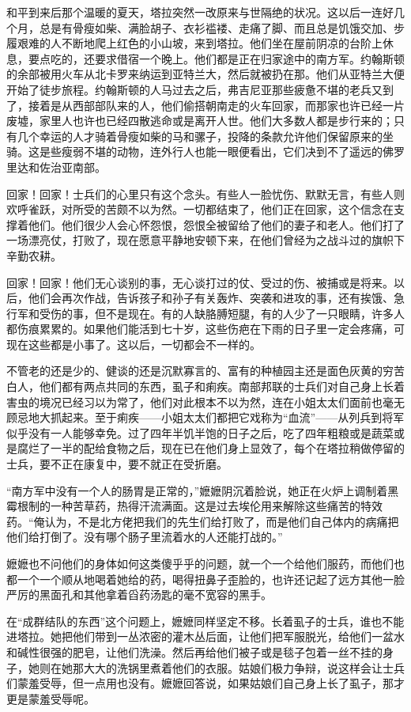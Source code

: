 \par 和平到来后那个温暖的夏天，塔拉突然一改原来与世隔绝的状况。这以后一连好几个月，总是有骨瘦如柴、满脸胡子、衣衫褴褛、走痛了脚、而且总是饥饿交加、步履艰难的人不断地爬上红色的小山坡，来到塔拉。他们坐在屋前阴凉的台阶上休息，要点吃的，还要求借宿一个晚上。他们都是正在归家途中的南方军。约翰斯顿的余部被用火车从北卡罗来纳运到亚特兰大，然后就被扔在那。他们从亚特兰大便开始了徒步旅程。约翰斯顿的人马过去之后，弗吉尼亚那些疲惫不堪的老兵又到了，接着是从西部部队来的人，他们偷搭朝南走的火车回家，而那家也许已经一片废墟，家里人也许也已经四散逃命或是离开人世。他们大多数人都是步行来的；只有几个幸运的人才骑着骨瘦如柴的马和骡子，投降的条款允许他们保留原来的坐骑。这是些瘦弱不堪的动物，连外行人也能一眼便看出，它们决到不了遥远的佛罗里达和佐治亚南部。
\par 回家！回家！士兵们的心里只有这个念头。有些人一脸忧伤、默默无言，有些人则欢呼雀跃，对所受的苦颇不以为然。一切都结束了，他们正在回家，这个信念在支撑着他们。他们很少人会心怀怨恨，怨恨全被留给了他们的妻子和老人。他们打了一场漂亮仗，打败了，现在愿意平静地安顿下来，在他们曾经为之战斗过的旗帜下辛勤农耕。
\par 回家！回家！他们无心谈别的事，无心谈打过的仗、受过的伤、被捕或是将来。以后，他们会再次作战，告诉孩子和孙子有关轰炸、突袭和进攻的事，还有挨饿、急行军和受伤的事，但不是现在。有的人缺胳膊短腿，有的人少了一只眼睛，许多人都伤痕累累的。如果他们能活到七十岁，这些伤疤在下雨的日子里一定会疼痛，可现在这些都是小事了。这以后，一切都会不一样的。
\par 不管老的还是少的、健谈的还是沉默寡言的、富有的种植园主还是面色灰黄的穷苦白人，他们都有两点共同的东西，虱子和痢疾。南部邦联的士兵们对自己身上长着害虫的境况已经习以为常了，他们对此根本不以为然，连在小姐太太们面前也毫无顾忌地大抓起来。至于痢疾——小姐太太们都把它戏称为“血流”——从列兵到将军似乎没有一人能够幸免。过了四年半饥半饱的日子之后，吃了四年粗粮或是蔬菜或是腐烂了一半的配给食物之后，现在已在他们身上显效了，每个在塔拉稍做停留的士兵，要不正在康复中，要不就正在受折磨。
\par “南方军中没有一个人的肠胃是正常的，”嬷嬷阴沉着脸说，她正在火炉上调制着黑霉根制的一种苦草药，热得汗流满面。这是过去埃伦用来解除这些痛苦的特效药。“俺认为，不是北方佬把我们的先生们给打败了，而是他们自己体内的病痛把他们给打倒了。没有哪个肠子里流着水的人还能打战的。”
\par 嬷嬷也不问他们的身体如何这类傻乎乎的问题，就一个一个给他们服药，而他们也都一个一个顺从地喝着她给的药，喝得扭鼻子歪脸的，也许还记起了远方其他一脸严厉的黑面孔和其他拿着舀药汤匙的毫不宽容的黑手。
\par 在“成群结队的东西”这个问题上，嬷嬷同样坚定不移。长着虱子的士兵，谁也不能进塔拉。她把他们带到一丛浓密的灌木丛后面，让他们把军服脱光，给他们一盆水和碱性很强的肥皂，让他们洗澡。然后再给他们被子或是毯子包着一丝不挂的身子，她则在她那大大的洗锅里煮着他们的衣服。姑娘们极力争辩，说这样会让士兵们蒙羞受辱，但一点用也没有。嬷嬷回答说，如果姑娘们自己身上长了虱子，那才更是蒙羞受辱呢。

